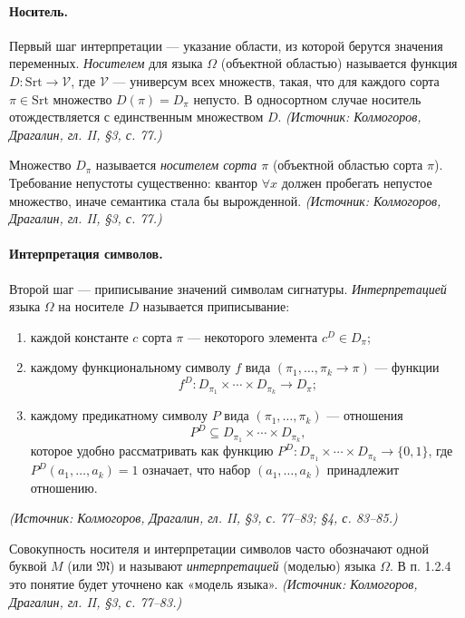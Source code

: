 \documentclass[a4paper,12pt]{article}
\begin{document}
\paragraph{Носитель.} Первый шаг интерпретации --- указание области, из которой берутся значения переменных. \emph{Носителем} для языка \(\Omega\) (объектной областью) называется функция \(D\colon\mathrm{Srt}\to\mathcal{V}\), где \(\mathcal{V}\) --- универсум всех множеств, такая, что для каждого сорта \(\pi\in\mathrm{Srt}\) множество \(D(\pi)=D_\pi\) непусто. В односортном случае носитель отождествляется с единственным множеством \(D\).
\textit{(Источник: Колмогоров, Драгалин, гл. II, §3, с. 77.)}

Множество \(D_\pi\) называется \emph{носителем сорта \(\pi\)} (объектной областью сорта \(\pi\)). Требование непустоты существенно: квантор \(\forall x\) должен пробегать непустое множество, иначе семантика стала бы вырожденной.
\textit{(Источник: Колмогоров, Драгалин, гл. II, §3, с. 77.)}

\paragraph{Интерпретация символов.} Второй шаг --- приписывание значений символам сигнатуры. \emph{Интерпретацией} языка \(\Omega\) на носителе \(D\) называется приписывание:
\begin{enumerate}[label=\arabic*)]
\item каждой константе \(c\) сорта \(\pi\) --- некоторого элемента \(c^D\in D_\pi\);
\item каждому функциональному символу \(f\) вида \((\pi_1,\ldots,\pi_k\to\pi)\) --- функции
\[
f^D\colon D_{\pi_1}\times\cdots\times D_{\pi_k}\to D_\pi;
\]
\item каждому предикатному символу \(P\) вида \((\pi_1,\ldots,\pi_k)\) --- отношения
\[
P^D\subseteq D_{\pi_1}\times\cdots\times D_{\pi_k},
\]
которое удобно рассматривать как функцию \(P^D\colon D_{\pi_1}\times\cdots\times D_{\pi_k}\to\{0,1\}\), где \(P^D(a_1,\ldots,a_k)=1\) означает, что набор \((a_1,\ldots,a_k)\) принадлежит отношению.
\end{enumerate}
\textit{(Источник: Колмогоров, Драгалин, гл. II, §3, с. 77--83; §4, с. 83--85.)}

Совокупность носителя и интерпретации символов часто обозначают одной буквой \(M\) (или \(\mathfrak{M}\)) и называют \emph{интерпретацией} (моделью) языка \(\Omega\). В п. 1.2.4 это понятие будет уточнено как «модель языка».
\textit{(Источник: Колмогоров, Драгалин, гл. II, §3, с. 77--83.)}
\end{document}

